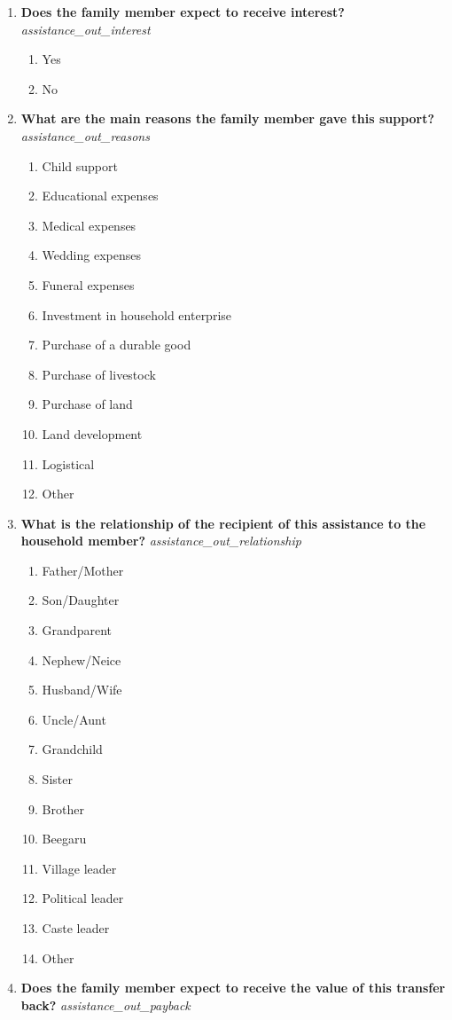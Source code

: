 \documentclass{article}
\begin{document}
\begin{enumerate}
\begin{enumerate}[label*=\arabic*.]
\item {\bfseries Does the family member expect to receive interest?}\emph{ assistance\_out\_interest } 
\begin{enumerate} 
\item Yes 
\item No 
\end{enumerate} 
\item {\bfseries What are the main reasons the family member gave this support?}\emph{ assistance\_out\_reasons } 
\begin{enumerate} 
\item Child support 
\item Educational expenses 
\item Medical expenses 
\item Wedding expenses 
\item Funeral expenses 
\item Investment in household enterprise 
\item Purchase of a durable good 
\item Purchase of livestock 
\item Purchase of land 
\item Land development 
\item Logistical 
\item Other 
\end{enumerate} 
\item {\bfseries What is the relationship of the recipient of this assistance to the household member?}\emph{ assistance\_out\_relationship } 
\begin{enumerate} 
\item Father/Mother 
\item Son/Daughter 
\item Grandparent 
\item Nephew/Neice 
\item Husband/Wife 
\item Uncle/Aunt 
\item Grandchild 
\item Sister 
\item Brother 
\item Beegaru 
\item Village leader 
\item Political leader 
\item Caste leader 
\item Other 
\end{enumerate} 
\item {\bfseries Does the family member expect to receive the value of this transfer back?}\emph{ assistance\_out\_payback } 

\end{enumerate}
\end{enumerate}
\end{document}
